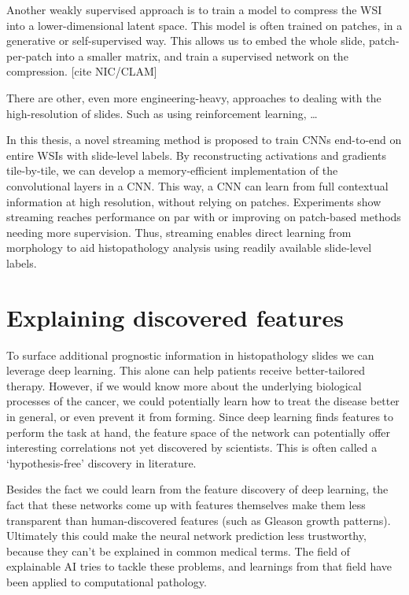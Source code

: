 \documentclass[
  12pt,
  a5,margin=2cmpaper,
]{article}
\begin{document}
Another weakly supervised approach is to train a model to compress the
WSI into a lower-dimensional latent space. This model is often trained
on patches, in a generative or self-supervised way. This allows us to
embed the whole slide, patch-per-patch into a smaller matrix, and train
a supervised network on the compression. {[}cite NIC/CLAM{]}

There are other, even more engineering-heavy, approaches to dealing with
the high-resolution of slides. Such as using reinforcement learning,
\ldots{}

In this thesis, a novel streaming method is proposed to train CNNs
end-to-end on entire WSIs with slide-level labels. By reconstructing
activations and gradients tile-by-tile, we can develop a
memory-efficient implementation of the convolutional layers in a CNN.
This way, a CNN can learn from full contextual information at high
resolution, without relying on patches. Experiments show streaming
reaches performance on par with or improving on patch-based methods
needing more supervision. Thus, streaming enables direct learning from
morphology to aid histopathology analysis using readily available
slide-level labels.

\hypertarget{explaining-discovered-features}{%
\section{Explaining discovered
features}\label{explaining-discovered-features}}

To surface additional prognostic information in histopathology slides we
can leverage deep learning. This alone can help patients receive
better-tailored therapy. However, if we would know more about the
underlying biological processes of the cancer, we could potentially
learn how to treat the disease better in general, or even prevent it
from forming. Since deep learning finds features to perform the task at
hand, the feature space of the network can potentially offer interesting
correlations not yet discovered by scientists. This is often called a
`hypothesis-free' discovery in literature.

Besides the fact we could learn from the feature discovery of deep
learning, the fact that these networks come up with features themselves
make them less transparent than human-discovered features (such as
Gleason growth patterns). Ultimately this could make the neural network
prediction less trustworthy, because they can't be explained in common
medical terms. The field of explainable AI tries to tackle these
problems, and learnings from that field have been applied to
computational pathology.
\end{document}
